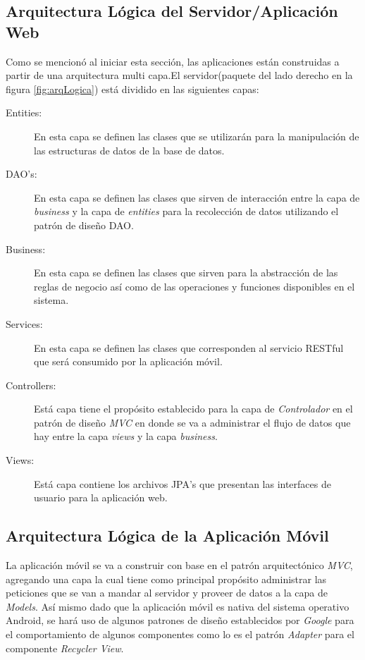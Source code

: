 \subsection{Arquitectura Lógica del Servidor/Aplicación Web}
Como se mencionó al iniciar esta sección, las aplicaciones están construidas a partir de una arquitectura multi capa.El servidor(paquete del lado derecho en la figura \ref{fig:arqLogica}) está dividido en las siguientes capas:
	\begin{description}
		\item[Entities:] En esta capa se definen las clases que se utilizarán para la manipulación de las estructuras de datos de la base de datos.
		\item[DAO's:] En esta capa se definen las clases que sirven de interacción entre la capa de \textit{business} y la capa de \textit{entities} para la recolección de datos utilizando el patrón de diseño DAO.
		\item[Business:] En esta capa se definen las clases que sirven para la abstracción de las reglas de negocio así como de las operaciones y funciones disponibles en el sistema.
		\item[Services:] En esta capa se definen las clases que corresponden al servicio RESTful que será consumido por la aplicación móvil.
		\item[Controllers:] Está capa tiene el propósito establecido para la capa de \textit{Controlador} en el patrón de diseño \textit{MVC} en donde se va a administrar el flujo de datos que hay entre la capa \textit{views} y la capa \textit{business}.
		\item[Views:] Está capa contiene los archivos JPA's que presentan las interfaces de usuario para la aplicación web.
	\end{description}
	
\subsection{Arquitectura Lógica de la Aplicación Móvil}
La aplicación móvil se va a construir con base en el patrón arquitectónico \textit{MVC}, agregando una capa la cual tiene como principal propósito administrar las peticiones que se van a mandar al servidor y proveer de datos a la capa de \textit{Models}. Así mismo dado que la aplicación móvil es nativa del sistema operativo Android, se hará uso de algunos patrones de diseño establecidos por \textit{Google} para el comportamiento de algunos componentes como lo es el patrón \textit{Adapter} para el componente \textit{Recycler View}.




